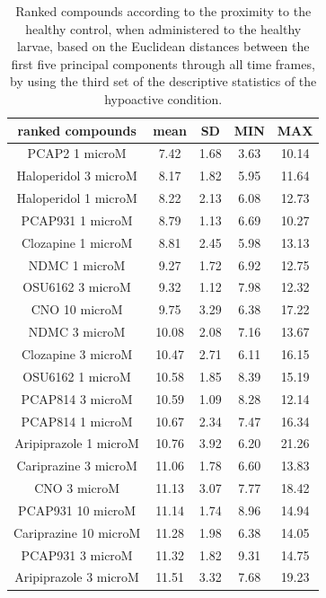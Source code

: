 \documentclass[a4paper,12pt]{article}
\begin{document}
\begin{table}[h!]\tiny
\centering
\caption{Ranked compounds according to the proximity to the healthy control, when administered to the healthy larvae, based on the Euclidean distances between the first five principal components through all time frames, by using the third set of the descriptive statistics of the hypoactive condition.}
\begin{tabular}{|c|c|c|c|c|}
\hline
ranked compounds             & mean & SD   & MIN  & MAX   \\ \hline
PCAP2 1 microM         & 7.42  & 1.68 & 3.63  & 10.14 \\ \hline
Haloperidol 3 microM   & 8.17  & 1.82 & 5.95  & 11.64 \\ \hline
Haloperidol 1 microM   & 8.22  & 2.13 & 6.08  & 12.73 \\ \hline
PCAP931 1 microM       & 8.79  & 1.13 & 6.69  & 10.27 \\ \hline
Clozapine 1 microM     & 8.81  & 2.45 & 5.98  & 13.13 \\ \hline
NDMC 1 microM          & 9.27  & 1.72 & 6.92  & 12.75 \\ \hline
OSU6162 3 microM       & 9.32  & 1.12 & 7.98  & 12.32 \\ \hline
CNO 10 microM          & 9.75  & 3.29 & 6.38  & 17.22 \\ \hline
NDMC 3 microM          & 10.08 & 2.08 & 7.16  & 13.67 \\ \hline
Clozapine 3 microM     & 10.47 & 2.71 & 6.11  & 16.15 \\ \hline
OSU6162 1 microM       & 10.58 & 1.85 & 8.39  & 15.19 \\ \hline
PCAP814 3 microM       & 10.59 & 1.09 & 8.28  & 12.14 \\ \hline
PCAP814 1 microM       & 10.67 & 2.34 & 7.47  & 16.34 \\ \hline
Aripiprazole 1 microM  & 10.76 & 3.92 & 6.20   & 21.26 \\ \hline
Cariprazine 3 microM   & 11.06 & 1.78 & 6.60   & 13.83 \\ \hline
CNO 3 microM           & 11.13 & 3.07 & 7.77  & 18.42 \\ \hline
PCAP931 10 microM      & 11.14 & 1.74 & 8.96  & 14.94 \\ \hline
Cariprazine 10 microM  & 11.28 & 1.98 & 6.38  & 14.05 \\ \hline
PCAP931 3 microM       & 11.32 & 1.82 & 9.31  & 14.75 \\ \hline
Aripiprazole 3 microM  & 11.51 & 3.32 & 7.68  & 19.23 \\ \hline

\end{tabular}
\end{table}
\end{document}
